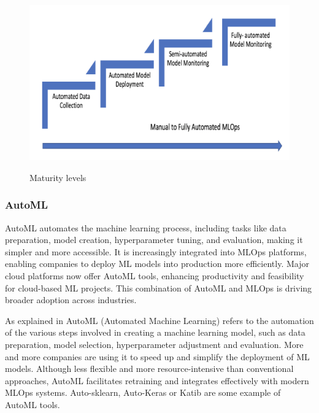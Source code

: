 \begin{figure}[!htbp]
    \caption{Maturity levels \cite{mlops-maturity-model}}
    \centering
    \includegraphics[scale=0.5]{images/maturity-levels}
    \label{fig:maturity}
\end{figure}

\subsubsection{AutoML}

AutoML automates the machine learning process, including tasks like data preparation, model creation, hyperparameter tuning, and evaluation,
making it simpler and more accessible.
It is increasingly integrated into MLOps platforms, enabling companies to deploy ML models into production more efficiently.
Major cloud platforms now offer AutoML tools, enhancing productivity and feasibility for cloud-based ML projects.
This combination of AutoML and MLOps is driving broader adoption across industries.\cite{gift2021practical,mlops-definition-tools-and-challenge}

As explained in\cite{mlops-definition-tools-and-challenge} AutoML (Automated Machine Learning) refers to the automation of the various steps involved in creating a machine learning model,
such as data preparation, model selection, hyperparameter adjustment and evaluation.
More and more companies are using it to speed up and simplify the deployment of ML models.
Although less flexible and more resource-intensive than conventional approaches, AutoML facilitates retraining and integrates effectively with modern MLOps systems.
Auto-sklearn, Auto-Keras or Katib are some example of AutoML tools.
